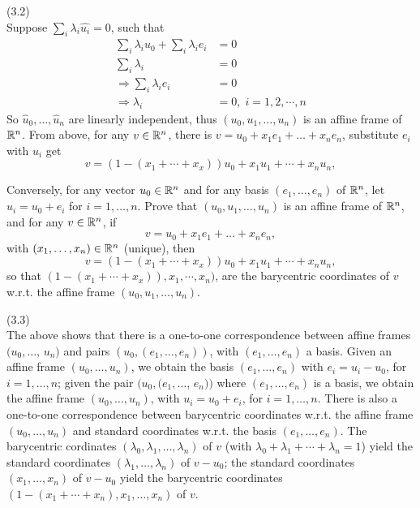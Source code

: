 \documentclass[12pt]{article}
\begin{document}
(3.2) \\
Suppose $\sum_i \lambda_i \widehat{u_i} = 0$, such that
\begin{align*}
\sum_i \lambda_i u_0 + \sum_i \lambda_i e_i &= 0 \\
\sum_i \lambda_i  &= 0 \\ 
\Rightarrow \sum_i \lambda_i e_i &= 0 \\
\Rightarrow \lambda_i &= 0, \; i = 1,2, \cdots, n
\end{align*}
So $\widehat{u}_0, \ldots,  \widehat{u}_{n}$ are linearly independent, thus $(u_0, u_1, \ldots, u_n)$ is an affine frame of $\mathbb{R}^n$.
From above, for any $v\in \mathbb{R}^n$, there is $v = u_0 + x_1 e_1 + \dots + x_n e_n$, substitute $e_i$ with $u_i$ get
\[
v = (1 - (x_1 + \cdots + x_x)) u_0 + x_1 u_1 + \cdots + x_n u_n,
\]
 

\medskip
Conversely, for any vector $u_0\in \mathbb{R}^n$ and for any basis
$(e_1, \ldots, e_n)$ of $\mathbb{R}^n$, let
$u_i = u_0 + e_i$ for $i = 1, \ldots, n$. Prove
that $(u_0, u_1, \ldots, u_n)$ is an affine frame of $\mathbb{R}^n$, 
and for any $v\in \mathbb{R}^n$, if  
\[
v = u_0 + x_1 e_1 + \dots + x_n e_n,
\]
with $(x_1, \ldots, x_n) \in \mathbb{R}^n$ (unique), then
\[
v = (1 - (x_1 + \cdots + x_x)) u_0 + x_1 u_1 + \cdots + x_n u_n,
\]
so that $(1 - (x_1 + \cdots + x_x)), x_1, \cdots,  x_n)$,
are the barycentric coordinates of $v$ w.r.t. the affine frame
$(u_0, u_1, \ldots, u_n)$.

(3.3) \\

\medskip
The above shows that there is a one-to-one correspondence between
affine frames $(u_0, \ldots$, $u_n)$ and pairs
$(u_0, (e_1, \ldots, e_n))$, with  $(e_1, \ldots, e_n)$  a basis.
Given  an affine frame  $(u_0, \ldots, u_n)$, we obtain the basis
$(e_1, \ldots, e_n)$ with $e_i = u_i - u_0$, for $i = 1, \ldots, n$;
given the pair $(u_0, (e_1, \ldots$, $e_n))$ where  $(e_1, \ldots, e_n)$
is a basis,  we obtain the affine frame   $(u_0, \ldots, u_n)$, with
$u_i = u_0 + e_i$, for $i = 1, \ldots, n$.
There is also a  one-to-one correspondence between
barycentric coordinates w.r.t. the affine frame
$(u_0, \ldots, u_n)$ and standard coordinates w.r.t.
the basis   $(e_1, \ldots, e_n)$.
The barycentric cordinates $(\lambda_0, \lambda_1, \ldots, \lambda_n)$
of $v$
(with $\lambda_0 + \lambda_1 + \cdots + \lambda_n = 1$) 
yield the standard coordinates $(\lambda_1, \ldots, \lambda_n)$ of $v - u_0$;
the standard coordinates $(x_1, \ldots, x_n)$ of $v - u_0$ yield the 
barycentric coordinates $(1 - (x_1 + \cdots + x_n ), x_1, \ldots,
x_n)$ of $v$.
\end{document}
